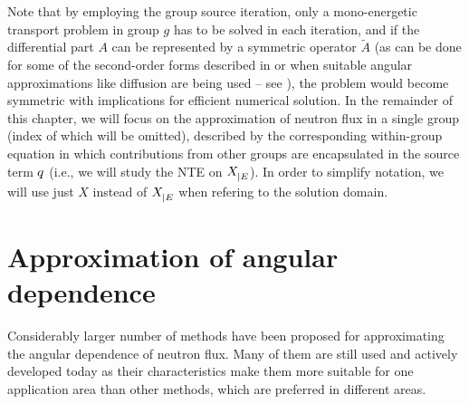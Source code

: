 Note that by employing the group source iteration, only a mono-energetic transport problem in group $g$ has to be
solved in each iteration, and if the differential part $A$ can be represented by a symmetric operator $\tilde A$ (as can be done for some of the second-order forms
described in  or when suitable angular approximations like diffusion are being
used -- see ), the problem would become symmetric with implications for efficient numerical
solution. In the remainder of this chapter, we will focus on the approximation of neutron flux in a single
group (index of which will be omitted), described by the corresponding within-group equation in which contributions from
other groups are encapsulated in the source term $q$ (i.e., we will study the NTE on $X_{\mid E}^{}$). In order to simplify
notation, we will use just $X$ instead of $X_{\mid E}^{}$ when refering to the solution domain.

\section{Approximation of angular dependence}

Considerably larger number of methods have been proposed for approximating the angular dependence of neutron
flux. Many of them are still used and actively developed today as their characteristics make them more suitable for one
application area than other methods, which are preferred in different areas.

